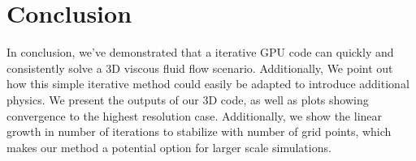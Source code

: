 \section*{\myfont Conclusion} %
In conclusion, we've demonstrated that a iterative GPU code can quickly and consistently solve a 3D viscous fluid flow scenario. Additionally, We point out how this simple iterative method could easily be adapted to introduce additional physics. We present the outputs of our 3D code, as well as plots showing convergence to the highest resolution case. Additionally, we show the linear growth in number of iterations to stabilize with number of grid points, which makes our method a potential option for larger scale simulations.

